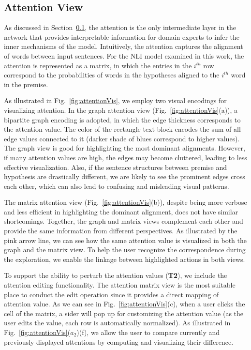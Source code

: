 

\subsection{Attention View}
\label{sec:attention}
As discussed in Section~\ref{sec:attention}, the attention is the only intermediate layer in the network that provides interpretable information for domain experts to infer the inner mechanisms of the model.
%
Intuitively, the attention captures the alignment of words between input sentences. For the NLI model examined in this work, the attention is represented as a matrix, in which the entries in the $i^{th}$ row correspond to the probabilities of words in the hypotheses aligned to the $i^{th}$ word in the premise.

As illustrated in Fig.~\ref{fig:attentionVis}, we employ two visual encodings for visualizing attention. In the graph attention view (Fig.~\ref{fig:attentionVis}(a)), a bipartite graph encoding is adopted, in which the edge thickness corresponds to the attention value. The color of the rectangle text block encodes the sum of all edge values connected to it (darker shade of blues correspond to higher values).
%
The graph view is good for highlighting the most dominant alignments. However, if many attention values are high, the edges may become cluttered, leading to less effective visualization. Also, if the sentence structures between premise and hypothesis are drastically different, we are likely to see the prominent edges cross each other, which can also lead to confusing and misleading visual patterns.

The matrix attention view (Fig.~\ref{fig:attentionVis}(b)), despite being more verbose and less efficient in highlighting the dominant alignment, does not have similar shortcomings. Together, the graph and matrix views complement each other and provide the same information from different perspectives. As illustrated by the pink arrow line, we can see how the same attention value is visualized in both the graph and the matrix view.
To help the user recognize the correspondence during the exploration, we enable the linkage between highlighted actions in both views.

To support the ability to perturb the attention values (\textbf{T2}), we include the attention editing functionality. The attention matrix view is the most suitable place to conduct the edit operation since it provides a direct mapping of attention value.
As we can see in Fig.~\ref{fig:attentionVis}(c), when a user clicks the cell of the matrix, a sider will pop up for customizing the attention value (as the user edits the value, each row is automatically normalized).
%
As illustrated in Fig.~\ref{fig:attentionVis}($a_{2}$)(f), we allow the user to compare currently and previously displayed attentions by computing and visualizing their difference.


